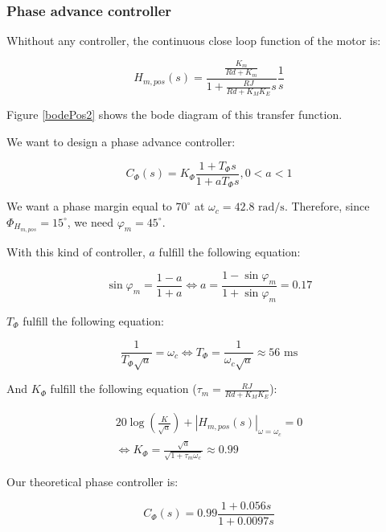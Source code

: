 \subsubsection*{Phase advance controller}

Whithout any controller, the continuous close loop function of the motor is:

$$ H_{m,pos}(s) = \frac{\frac{K_m}{Rd+K_m}}{1+\frac{RJ}{Rd+K_M K_E}s} \frac{1}{s}$$

Figure \ref{bodePos2} shows the bode diagram of this transfer function.

We want to design a phase advance controller:

$$C_{\Phi}(s) = K_{\Phi} \frac{1 + T_{\Phi}s}{1 + a T_{\Phi} s}, 0 < a < 1$$ 

We want a phase margin equal to $70^{\circ}$ at $\omega_c = 42.8 \text{ rad/s}$. Therefore, since $\Phi_{H_{m,pos}} = 15^{\circ}$, we need $\varphi_m = 45^{\circ}$.

With this kind of controller, $a$ fulfill the following equation:

$$\sin\varphi_m = \frac{1-a}{1+a} \Leftrightarrow a = \frac{1 - \sin\varphi_m}{1 + \sin\varphi_m} = 0.17$$

$T_{\Phi}$ fulfill the following equation:

$$\frac{1}{T_{\Phi}\sqrt{a}} = \omega_c \Leftrightarrow T_{\Phi} = \frac{1}{\omega_c \sqrt{a}} \approx 56 \text{ ms}$$

And $K_{\Phi}$ fulfill the following equation ($\tau_m = \frac{RJ}{Rd+K_M K_E}$): 

\begin{multline*} 20 \log\left(\frac{K}{\sqrt{a}}\right) + |H_{m,pos}(s)|_{\omega = \omega_c} = 0 \\ \Leftrightarrow K_{\Phi} = \frac{\sqrt{a}}{\sqrt{1 + \tau_m \omega_c}} \approx 0.99 \end{multline*}


Our theoretical phase controller is:

$$C_{\Phi}(s) = 0.99 \frac{1 + 0.056s}{1 + 0.0097s} $$



